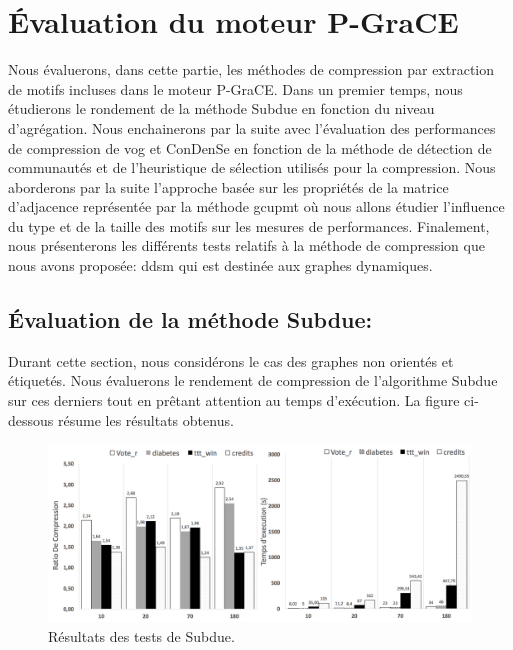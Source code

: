 	\section{Évaluation du moteur P-GraCE}
	
	Nous évaluerons, dans cette partie, les méthodes de compression par extraction de motifs incluses dans le moteur P-GraCE. 
	Dans un premier temps, nous étudierons  le rondement de la méthode Subdue en fonction du niveau d'agrégation.  Nous enchainerons par la suite avec l'évaluation des performances de compression de \gls{vog} et \gls{ConDenSe} en fonction de la méthode de détection de communautés et de l'heuristique de sélection utilisés pour la compression. Nous aborderons par la suite l'approche basée sur les propriétés de la matrice d'adjacence représentée par la méthode \gls{gcupmt} où nous allons étudier l'influence du type et de la taille des motifs sur les mesures de performances.
	Finalement, nous présenterons les différents tests relatifs à la méthode de compression que nous avons proposée: \gls{ddsm} qui est destinée aux graphes dynamiques.
	\subsection{Évaluation de la méthode Subdue:}
	
  Durant cette section, nous considérons le cas des graphes non orientés et étiquetés. Nous évaluerons le rendement de compression de l'algorithme Subdue sur ces derniers tout en prêtant attention au temps d'exécution. La figure ci-dessous résume les résultats obtenus.
  

	\begin{figure}[H]
	
			
			\includegraphics[scale=0.37]{ressources/image/beam.png}
			
			\caption{Résultats des tests de Subdue.}
			\label{fig:test-beam}
	
	\end{figure}
	
